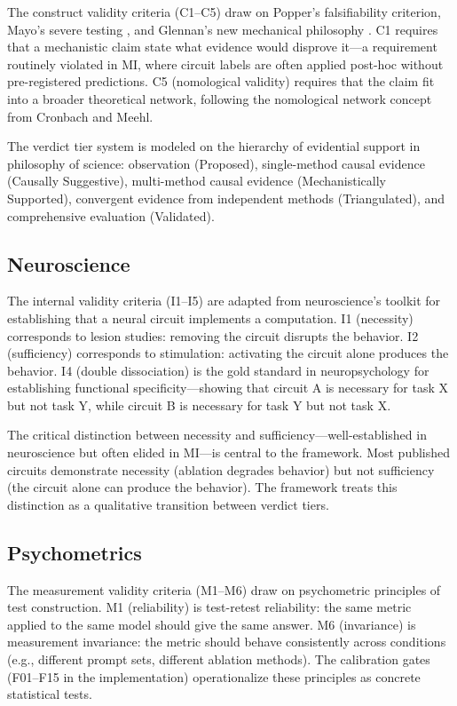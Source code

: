 \documentclass[10pt]{article}
\newcommand{\eg}{e.g.}
\begin{document}
The construct validity criteria (C1--C5) draw on Popper's falsifiability criterion, Mayo's severe testing \citep{mayo2018statistical}, and Glennan's new mechanical philosophy \citep{glennan2017new}. C1 requires that a mechanistic claim state what evidence would disprove it---a requirement routinely violated in MI, where circuit labels are often applied post-hoc without pre-registered predictions. C5 (nomological validity) requires that the claim fit into a broader theoretical network, following the nomological network concept from Cronbach and Meehl.

The verdict tier system is modeled on the hierarchy of evidential support in philosophy of science: observation (Proposed), single-method causal evidence (Causally Suggestive), multi-method causal evidence (Mechanistically Supported), convergent evidence from independent methods (Triangulated), and comprehensive evaluation (Validated).

\subsection{Neuroscience}
\label{sec:neuro}

The internal validity criteria (I1--I5) are adapted from neuroscience's toolkit for establishing that a neural circuit implements a computation. I1 (necessity) corresponds to lesion studies: removing the circuit disrupts the behavior. I2 (sufficiency) corresponds to stimulation: activating the circuit alone produces the behavior. I4 (double dissociation) is the gold standard in neuropsychology for establishing functional specificity---showing that circuit A is necessary for task X but not task Y, while circuit B is necessary for task Y but not task X.

The critical distinction between necessity and sufficiency---well-established in neuroscience but often elided in MI---is central to the framework. Most published circuits demonstrate necessity (ablation degrades behavior) but not sufficiency (the circuit alone can produce the behavior). The framework treats this distinction as a qualitative transition between verdict tiers.

\subsection{Psychometrics}
\label{sec:psychometrics}

The measurement validity criteria (M1--M6) draw on psychometric principles of test construction. M1 (reliability) is test-retest reliability: the same metric applied to the same model should give the same answer. M6 (invariance) is measurement invariance: the metric should behave consistently across conditions (\eg, different prompt sets, different ablation methods). The calibration gates (F01--F15 in the implementation) operationalize these principles as concrete statistical tests.
\end{document}
